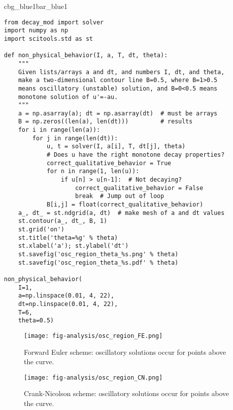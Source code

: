 \documentclass[graybox,sectrefs,envcountresetchap,open=right,final]{svmonodo}
\newenvironment{_pro_tight}[2]{
   \def\FrameCommand{\color{#2}\vrule width 1mm\normalcolor\colorbox{#1}}
   \FrameRule0.6pt\MakeFramed {\advance\hsize-2mm\FrameRestore}\vskip3mm}
   {\vskip0mm\endMakeFramed}
\newenvironment{pro}[2]{
\bgroup\rmfamily
\fboxsep=0mm\relax
\begin{_pro_tight}{#1}{#2}
\list{}{\parsep=-2mm\parskip=0mm\topsep=0pt\leftmargin=2mm
\rightmargin=2\leftmargin\leftmargin=4pt\relax}
\item\relax}
{\endlist\end{_pro_tight}\egroup}
\begin{document}
\begin{pro}{cbg_blue1}{bar_blue1}\begin{Verbatim}[numbers=none,fontsize=\fontsize{9pt}{9pt},baselinestretch=0.95,xleftmargin=2mm]
from decay_mod import solver
import numpy as np
import scitools.std as st

def non_physical_behavior(I, a, T, dt, theta):
    """
    Given lists/arrays a and dt, and numbers I, dt, and theta,
    make a two-dimensional contour line B=0.5, where B=1>0.5
    means oscillatory (unstable) solution, and B=0<0.5 means
    monotone solution of u'=-au.
    """
    a = np.asarray(a); dt = np.asarray(dt)  # must be arrays
    B = np.zeros((len(a), len(dt)))         # results
    for i in range(len(a)):
        for j in range(len(dt)):
            u, t = solver(I, a[i], T, dt[j], theta)
            # Does u have the right monotone decay properties?
            correct_qualitative_behavior = True
            for n in range(1, len(u)):
                if u[n] > u[n-1]:  # Not decaying?
                    correct_qualitative_behavior = False
                    break  # Jump out of loop
            B[i,j] = float(correct_qualitative_behavior)
    a_, dt_ = st.ndgrid(a, dt)  # make mesh of a and dt values
    st.contour(a_, dt_, B, 1)
    st.grid('on')
    st.title('theta=%g' % theta)
    st.xlabel('a'); st.ylabel('dt')
    st.savefig('osc_region_theta_%s.png' % theta)
    st.savefig('osc_region_theta_%s.pdf' % theta)

non_physical_behavior(
    I=1,
    a=np.linspace(0.01, 4, 22),
    dt=np.linspace(0.01, 4, 22),
    T=6,
    theta=0.5)
\end{Verbatim}
\end{pro}
\noindent


\begin{figure}[!ht]  %
  \centerline{\texttt{[image: fig-analysis/osc\_region\_FE.png]}}
  \caption{
  Forward Euler scheme: oscillatory solutions occur for points above the curve. \label{decay:analysis:B:FE}
  }
\end{figure}



\begin{figure}[!ht]  %
  \centerline{\texttt{[image: fig-analysis/osc\_region\_CN.png]}}
  \caption{
  Crank-Nicolson scheme: oscillatory solutions occur for points above the curve. \label{decay:analysis:B:CN}
  }
\end{figure}
\end{document}
